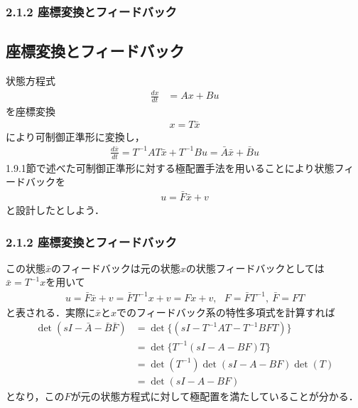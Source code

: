 \begin{frame}[t]
\frametitle{2.1.2 座標変換とフィードバック}


\subsection{座標変換とフィードバック}

状態方程式
\begin{align}
 \frac{dx}{dt} &= Ax + Bu
\nonumber
\end{align}
を座標変換
\begin{align}
 x = T\bar{x}
\end{align}
により可制御正準形に変換し，
\begin{align}
 \frac{ d \bar{x}}{dt} = T^{-1} A T \bar{x} + T^{-1} B u = \bar{A} \bar{x} + \bar{B} u
\end{align}
1.9.1節で述べた可制御正準形に対する極配置手法を用いることにより状態フィードバックを
\begin{align}
 u =\bar{F} \bar{x} + v
\end{align}
と設計したとしよう．
\end{frame}

\begin{frame}[t]
\frametitle{2.1.2 座標変換とフィードバック}
この状態$\bar{x}$のフィードバックは元の状態$x$の状態フィードバックとしては$\bar{x} = T^{-1} x$を用いて
\begin{align}
 u = \bar{F} \bar{x} + v = \bar{F} T^{-1} x + v = F x + v, \ \ \ F=\bar{F} T^{-1}, \ \bar{F} = FT
\end{align}
と表される．実際に$\bar{x}$と$x$でのフィードバック系の特性多項式を計算すれば
\begin{align}
  \det (s I - \bar{A} - \bar{B} \bar{F}) 
  &=
  \det \{(s I - T^{-1} A T - T^{-1} B F T) \} 
\nonumber \\
  &=
  \det \{T^{-1}(s I -  A -  B F ) T\} 
\nonumber \\
  &=
  \det (T^{-1}) \det (s I - A - B F) \det (T) 
\nonumber \\
  &=
  \det (s I - A - B F) 
\end{align}
となり，この$F$が元の状態方程式に対して極配置を満たしていることが分かる．
\end{frame}

